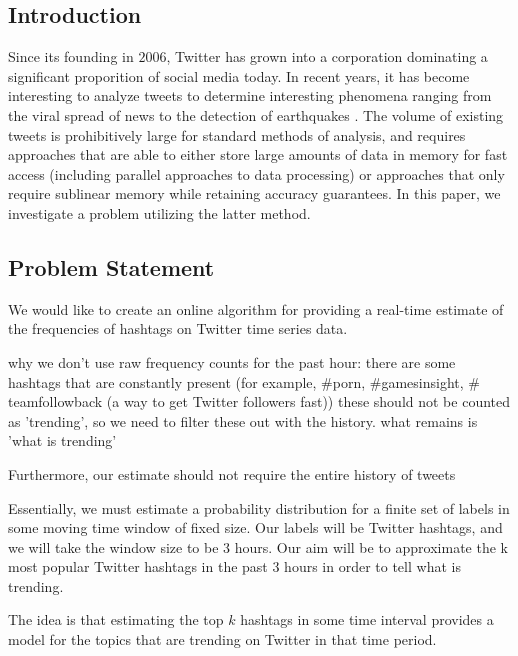 \documentclass[twoside]{article}
\newcommand{\cc}[1]
 {\textbf{\cite{#1}}}
\begin{document}
\begin{multicols}{2} %

\section{Introduction} \label{sec:Intro}

Since its founding in $2006$, Twitter has grown into a corporation dominating a significant
proporition of social media today. In recent years, it has become interesting to analyze tweets
to determine interesting phenomena ranging from the viral spread of news to the detection of earthquakes \cc{Burks:2014}. The volume of existing tweets is prohibitively large for standard methods of analysis, and requires approaches that are able to either store large amounts of data in memory for fast access (including parallel approaches to data processing) or approaches that only require sublinear memory while retaining accuracy guarantees. In this paper, we investigate a problem utilizing the latter method. 

\subsection{Problem Statement} 

We would like to create an online algorithm for providing a real-time estimate of the frequencies of hashtags on Twitter time series data.

why we don't use raw frequency counts for the past hour:
there are some hashtags that are constantly present (for example, $\#$porn, $\#$gamesinsight, $\#$teamfollowback (a way to get Twitter followers fast))
these should not be counted as 'trending', so we need to filter these out
with the history. what remains is 'what is trending'

Furthermore, our estimate should not require the entire history of tweets 

Essentially, we must estimate a probability distribution for a finite set of labels in some moving time window of fixed size. Our labels will be Twitter hashtags, and we will take the window size to be 3 hours.
Our aim will be to approximate the k most popular Twitter hashtags in the past 3 hours in order to tell what is trending.

The idea is that estimating the top $k$ hashtags in some time interval provides a model for the topics that are trending on Twitter in that time period.



\end{multicols}
\end{document}
